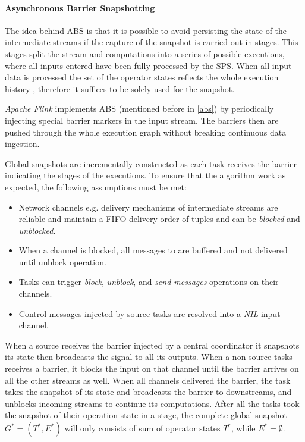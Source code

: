 \paragraph{Asynchronous Barrier Snapshotting}
 The idea behind ABS\cite{abs} is that it is possible to avoid persisting the state of the intermediate streams if the capture of the snapshot is carried out in stages. This stages split the stream and computations into a series of possible executions, where all inputs entered have been fully processed by the SPS. When all input data is processed the set of the operator states reflects the whole execution history , therefore it suffices to be solely used for the snapshot.

\textit{Apache Flink} implements ABS (mentioned before in \ref{abs}) by periodically injecting special barrier markers in the input stream. The barriers then are pushed through the whole execution graph without breaking continuous data ingestion.

Global snapshots are incrementally constructed as each task receives the barrier indicating the stages of the executions. To ensure that the algorithm work as expected, the following assumptions must be met:

\begin{itemize}
\item Network channels e.g. delivery mechanisms of intermediate streams are reliable and maintain a FIFO delivery order of tuples and can be 
\textit{blocked} and \textit{unblocked}.
\item When a channel is blocked, all messages to are buffered and not delivered until unblock operation.
\item Tasks can trigger \textit{block}, \textit{unblock}, and \textit{send messages} operations on their channels.
\item Control messages injected by source tasks are resolved into a \textit{NIL} input channel.
\end{itemize}

When a source  receives the barrier injected by a central coordinator it snapshots its state then broadcasts the signal to all its outputs. When a non-source tasks receives a barrier, it blocks the input on that channel until the barrier arrives on all the other streams as well. When all channels delivered the barrier, the task takes the snapshot of its state and broadcasts the barrier to downstreams, and unblocks incoming streams to continue its computations.
After all the tasks took the snapshot of their operation state in a stage, the complete global snapshot $G^{*} = (T^{*},E^{*})$ will only consists of sum of operator states $T^{*}$, while $E^{*}= \emptyset$.

